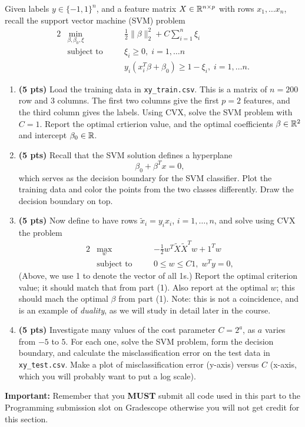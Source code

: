 \bigskip
\noindent
Given labels $y \in \{-1,1\}^n$, and a feature matrix $X \in
\mathbb{R}^{n\times p}$ with rows $x_1,\ldots x_n$, recall the support vector machine 
(SVM) problem
\begin{alignat*}{2}
&\min_{\beta,\beta_0,\xi} \quad
&& \frac{1}{2} \|\beta\|_2^2 + C \sum_{i=1}^n \xi_i \\ 
&\text{subject to} \quad && \xi_i \geq 0, \; i=1,\ldots n \\
& && y_i(x_i^T \beta + \beta_0) \geq 1-\xi_i, \;
i=1,\ldots n.
\end{alignat*}  
\begin{enumerate}
\item \textbf{(5 pts)} Load the training data in {\tt xy\_train.csv}.  This is a matrix of $n=200$
  row and 3 columns.  The first two columns give the first $p=2$ features, and
  the third column gives the labels.  Using CVX, solve the SVM problem with
  $C=1$.  Report the optimal crtierion value, and the optimal coefficients
  $\beta \in \mathbb{R}^2$ and intercept $\beta_0 \in \mathbb{R}$.  

\item \textbf{(5 pts)} Recall that the SVM solution defines a hyperplane
  $$
  \beta_0 + \beta^T x = 0,
  $$
  which serves as the decision boundary for the SVM classifier.  Plot the
  training data and color the points from the two classes differently.  Draw 
  the decision boundary on top.  

\item \textbf{(5 pts)} Now define  to have rows
  $\widetilde{x}_i=y_i x_i$, $i=1,\ldots,n$, and solve using CVX the problem  
  \begin{alignat*}{2}
    &\max_w \quad && -\frac{1}{2} w^T \widetilde{X} \widetilde{X}^T w + 1^T w \\   
    &\text{subject to} \quad && 0 \leq w \leq C1, \; w^T y = 0,
  \end{alignat*}  
  (Above, we use 1 to denote the vector of all 1s.)  Report the optimal
  criterion value; it should match that from part (1).  Also report
   at the optimal $w$; this should mach the optimal
  $\beta$ from part (1).  Note: this is not a coincidence, and is an example of
  {\it duality}, as we will study in detail later in the course. 

\item \textbf{(5 pts)} Investigate many values of the cost parameter $C=2^a$, as $a$ varies from
  $-5$ to $5$.  For each one, solve the SVM problem, form the decision boundary,
  and calculate the misclassification error on the test data in {\tt
    xy\_test.csv}.  Make a plot of misclassification error (y-axis) versus $C$
  (x-axis, which you will probably want to put a log scale). 

\end{enumerate}

\textbf{Important: }Remember that you \textbf{MUST} submit all code used in this part to the Programming submission slot on Gradescope otherwise you will not get credit for this section.
